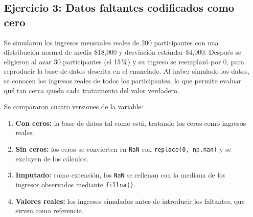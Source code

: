 \documentclass[11pt,letterpaper]{article}
\begin{document}

\subsection{Ejercicio 3: Datos faltantes codificados como cero}

Se simularon los ingresos mensuales reales de 200 participantes con una distribución normal de media \$18,000 y desviación estándar \$4,000. Después se eligieron al azar 30 participantes (el 15\,\%) y su ingreso se reemplazó por 0, para reproducir la base de datos descrita en el enunciado. Al haber simulado los datos, se conocen los ingresos reales de todos los participantes, lo que permite evaluar qué tan cerca queda cada tratamiento del valor verdadero.

Se compararon cuatro versiones de la variable:

\begin{enumerate}
    \item \textbf{Con ceros:} la base de datos tal como está, tratando los ceros como ingresos reales.
    \item \textbf{Sin ceros:} los ceros se convierten en \texttt{NaN} con \texttt{replace(0, np.nan)} y se excluyen de los cálculos.
    \item \textbf{Imputado:} como extensión, los \texttt{NaN} se rellenan con la mediana de los ingresos observados mediante \texttt{fillna()}.
    \item \textbf{Valores reales:} los ingresos simulados antes de introducir los faltantes, que sirven como referencia.
\end{enumerate}
\end{document}
